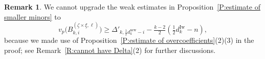 \documentclass[12pt]{amsart}
\theoremstyle{definition}
\newtheorem{remark}[subsection]{Remark}
\numberwithin{equation}{subsection}
\DeclareMathOperator{\NP}{NP}
\newcommand{\bbsigma}{\boldsymbol{\sigma}}
\newcommand{\new}{\mathrm{new}}
\newcommand{\Iw}{\mathrm{Iw}}
\newcommand{\ur}{\mathrm{ur}}
\begin{document}

\begin{remark}\label{R:we cannot use Delta'-Delta'}
    We cannot upgrade the weak estimates in Proposition~\ref{P:estimate of smaller minors} to 
    \[
	v_p\big(B_{k,i}^{(\underline \zeta\times \underline \xi,\ell)} \big)\geq \Delta'_{k,\frac 12 d_k^\new-i}-\tfrac {k-2}2(\tfrac 12 d_k^\Iw-n),
	\]
because we made use of Proposition~\ref{P:estimate of overcoefficients}(2)(3) in the proof; see Remark~\ref{R:cannot have Delta}(2) for further discussions.
\end{remark}
\end{document}
